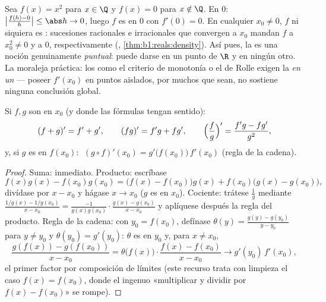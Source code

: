 \begin{example}\label{ex:b1:derivative:onepoint}
Sea $f(x) = x^2$ para $x \in \Q$ y $f(x) = 0$ para $x \notin \Q$. En
$0$: $\bigl|\frac{f(h) - 0}{h}\bigr| \leq \abs h \to 0$, luego $f$ es
 en $0$ con $f'(0) = 0$. En cualquier $x_0 \neq 0$, $f$ ni
siquiera es : sucesiones racionales e irracionales que
convergen a $x_0$ mandan $f$ a $x_0^2 \neq 0$ y a $0$,
respectivamente (, \cref{thm:b1:reals:density}). Así pues, la
 es una noción genuinamente \emph{puntual}: puede darse
en un punto de $\R$ y en ningún otro. La moraleja práctica: los
 como el criterio de monotonía o el de Rolle exigen la
 \emph{en un } --- poseer $f'(x_0)$ en puntos
aislados, por muchos que sean, no sostiene ninguna conclusión global.
\end{example}

\begin{theorem}[Operaciones]\label{thm:b1:derivative:operations}
Si $f, g$ son  en $x_0$ (y donde las fórmulas tengan
sentido):
\[
(f + g)' = f' + g', \qquad
(fg)' = f'g + fg', \qquad
\Bigl(\frac fg\Bigr)' = \frac{f'g - fg'}{g^2},
\]
y, si $g$ es  en $f(x_0)$:
$\;(g \circ f)'(x_0) = g'\bigl(f(x_0)\bigr)\, f'(x_0)$ (regla de la
cadena).
\end{theorem}

\begin{proof}
Suma: inmediato. Producto: escríbase
\[
f(x)g(x) - f(x_0)g(x_0)
= \bigl(f(x) - f(x_0)\bigr) g(x) + f(x_0)\bigl(g(x) - g(x_0)\bigr),
\]
divídase por $x - x_0$ y hágase $x \to x_0$ ($g$ es  en
$x_0$). Cociente: trátese $\frac 1g$ mediante
$\frac{1/g(x) - 1/g(x_0)}{x - x_0} =
\frac{-1}{g(x)g(x_0)}\cdot\frac{g(x) - g(x_0)}{x - x_0}$ y aplíquese
después la regla del producto. Regla de la cadena: con
$y_0 = f(x_0)$, defínase $\theta(y) = \frac{g(y) - g(y_0)}{y - y_0}$
para $y \neq y_0$ y $\theta(y_0) = g'(y_0)$: $\theta$ es  en
$y_0$ y, para $x \neq x_0$,
\[
\frac{g(f(x)) - g(f(x_0))}{x - x_0}
= \theta\bigl(f(x)\bigr)\cdot \frac{f(x) - f(x_0)}{x - x_0}
\longrightarrow g'(y_0)\, f'(x_0),
\]
el primer factor por composición de límites (este recurso trata con
limpieza el caso $f(x) = f(x_0)$, donde el ingenuo «multiplicar y
dividir por $f(x) - f(x_0)$» se rompe).
\end{proof}

